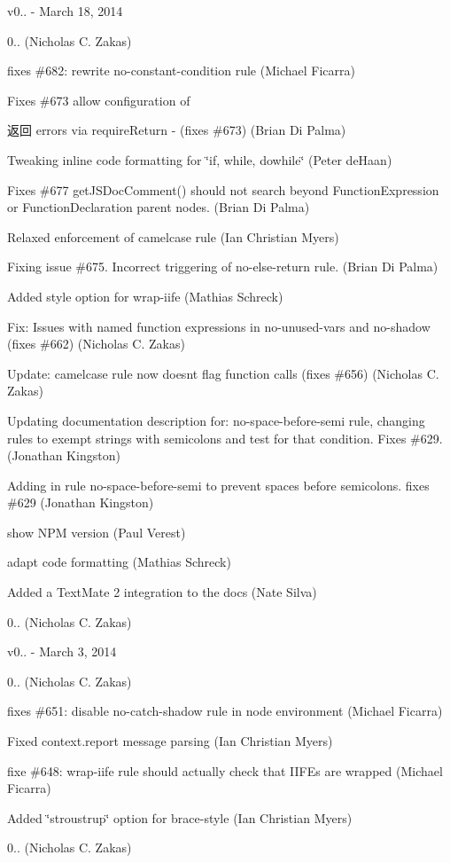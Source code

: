 v0.. -\/ March 18, 2014


\begin{DoxyItemize}
\item 0.. (Nicholas C. Zakas)
\item fixes \#682\+: rewrite no-\/constant-\/condition rule (Michael Ficarra)
\item Fixes \#673 allow configuration of \begin{DoxyReturn}{返回}
errors via require\+Return -\/ (fixes \#673) (Brian Di Palma)
\end{DoxyReturn}

\item Tweaking inline code formatting for \char`\"{}if, while, dowhile\char`\"{} (Peter de\+Haan)
\item Fixes \#677 get\+J\+S\+Doc\+Comment() should not search beyond Function\+Expression or Function\+Declaration parent nodes. (Brian Di Palma)
\item Relaxed enforcement of camelcase rule (Ian Christian Myers)
\item Fixing issue \#675. Incorrect triggering of no-\/else-\/return rule. (Brian Di Palma)
\item Added style option for wrap-\/iife (Mathias Schreck)
\item Fix\+: Issues with named function expressions in no-\/unused-\/vars and no-\/shadow (fixes \#662) (Nicholas C. Zakas)
\item Update\+: camelcase rule now doesn\textquotesingle{}t flag function calls (fixes \#656) (Nicholas C. Zakas)
\item Updating documentation description for\+: no-\/space-\/before-\/semi rule, changing rules to exempt strings with semicolons and test for that condition. Fixes \#629. (Jonathan Kingston)
\item Adding in rule no-\/space-\/before-\/semi to prevent spaces before semicolons. fixes \#629 (Jonathan Kingston)
\item show N\+PM version (Paul Verest)
\item adapt code formatting (Mathias Schreck)
\item Added a Text\+Mate 2 integration to the docs (Nate Silva)
\item 0.. (Nicholas C. Zakas)
\end{DoxyItemize}

v0.. -\/ March 3, 2014


\begin{DoxyItemize}
\item 0.. (Nicholas C. Zakas)
\item fixes \#651\+: disable no-\/catch-\/shadow rule in node environment (Michael Ficarra)
\item Fixed context.\+report message parsing (Ian Christian Myers)
\item fixe \#648\+: wrap-\/iife rule should actually check that I\+I\+F\+Es are wrapped (Michael Ficarra)
\item Added \char`\"{}stroustrup\char`\"{} option for brace-\/style (Ian Christian Myers)
\item 0.. (Nicholas C. Zakas)
\end{DoxyItemize}

